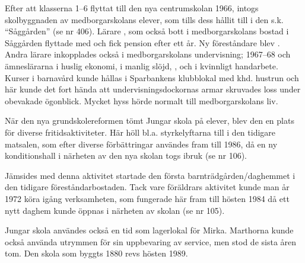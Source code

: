 Efter att klasserna 1--6 flyttat till den nya centrumskolan 1966, intogs skolbyggnaden av medborgarskolans elever, som tills dess hållit till i den s.k. ``Såggården'' (se nr 406). Lärare , som också bott i medborgarskolans bostad i Såggården flyttade med och fick pension efter ett år. Ny föreståndare blev . Andra lärare inkopplades också i medborgarskolans undervisning;  1967--68 och ämneslärarna  i huslig ekonomi,  i manlig slöjd, ,  och  i kvinnligt handarbete. Kurser i barnavård kunde hållas i Sparbankens klubblokal med khd. hustrun  och här kunde det fort hända att undervisningsdockornas armar skruvades loss under obevakade ögonblick. Mycket hyss hörde normalt till medborgarskolans liv.

När den nya grundskolereformen tömt Jungar skola på elever, blev den en plats för diverse fritidsaktiviteter. Här höll bl.a. styrkelyftarna till i den tidigare matsalen, som efter diverse förbättringar användes fram till 1986, då en ny konditionshall i närheten av den nya skolan togs ibruk (se nr 106).

Jämsides med denna aktivitet startade den första barnträdgården/daghemmet i den tidigare föreståndarbostaden. Tack vare föräldrars aktivitet kunde man år 1972 köra igång verksamheten, som fungerade här fram till hösten 1984 då ett nytt daghem kunde öppnas i närheten av skolan (se nr 105).

Jungar skola användes också en tid som lagerlokal för Mirka. Marthorna kunde också använda utrymmen för sin uppbevaring av service, men stod de sista åren tom. Den skola som byggts 1880 revs hösten 1989.




\jhnooccupant{}

